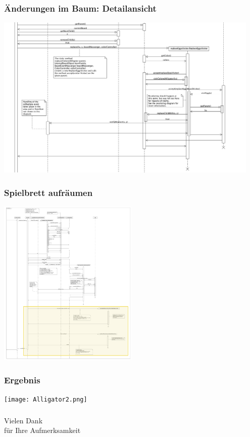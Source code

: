 \documentclass[t]{beamer}
\begin{document}
\begin{frame}
	\frametitle{Änderungen im Baum: Detailansicht}
	\includegraphics[width=0.95\textwidth]{ReplaceEggs.png}
\end{frame}

\begin{frame}
	\frametitle{Spielbrett aufräumen}
	\begin{center}
		\includegraphics[width=0.5\textwidth]{Beta-Reduction-withYellow.png}
	\end{center}
\end{frame}

\begin{frame}
	\frametitle{Ergebnis}
	\begin{center}
		\texttt{[image: Alligator2.png]}
	\end{center}
\end{frame}

\begin{frame}
	\frametitle{}
	\begin{center}
	\begin{Huge}
		Vielen Dank\\ für Ihre Aufmerksamkeit
	\end{Huge}
	\end{center}
\end{frame}

\end{document}
